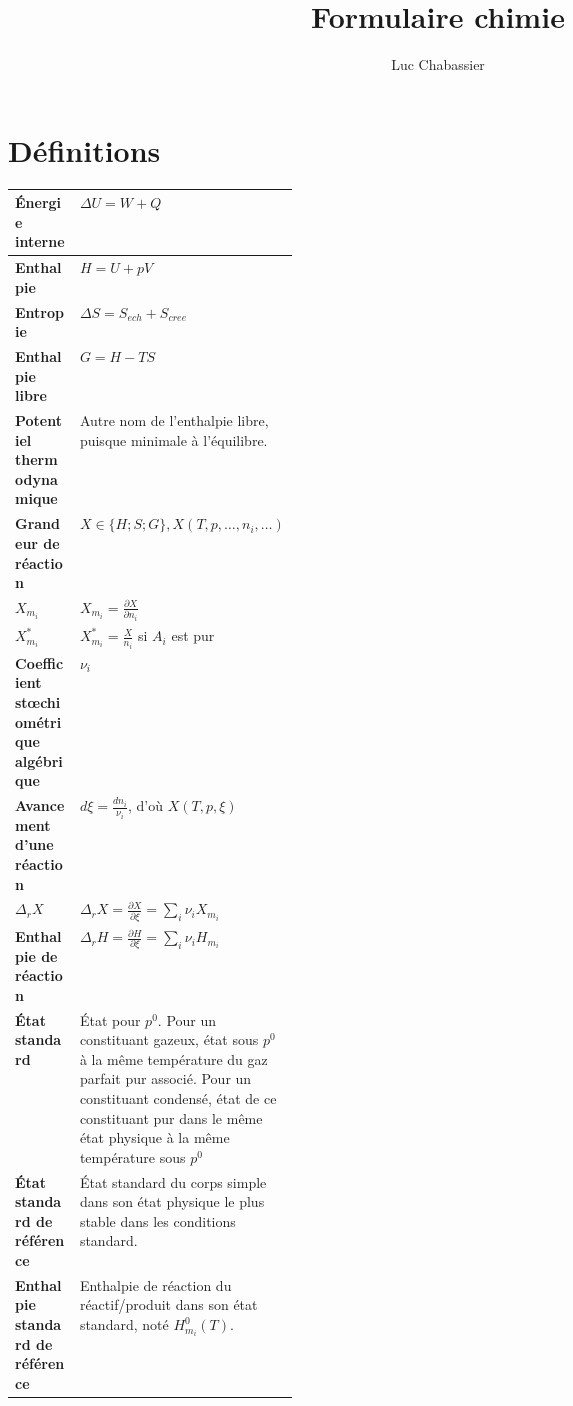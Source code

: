 \documentclass[12pt,a4paper] {article}
\begin{document}
\title{Formulaire chimie}
\author{Luc Chabassier}
\maketitle

\section{Définitions}
\begin{tabularx}{\linewidth}{|>{\bfseries}p{0.33\linewidth}|X|} \hline
    Énergie interne & $\Delta U = W + Q$ \\ \hline
    Enthalpie        & $H = U + pV$ \\ \hline
    Entropie        & $\Delta S = S_{ech} + S_{cree}$ \\ \hline
    Enthalpie libre  & $G = H - TS$ \\ \hline
    Potentiel thermodynamique & Autre nom de l'enthalpie libre, puisque minimale à l'équilibre. \\ \hline
    Grandeur de réaction & $X \in\{H; S; G\}, X(T, p, \ldots, n_i, \ldots)$ \\ \hline
    $X_{m_i}$ & $X_{m_i} = \frac{\partial X}{\partial n_i}$ \\ \hline
    $X_{m_i}^*$ & $X_{m_i}^* = \frac{X}{n_i}$ si $A_i$ est pur \\ \hline
    Coefficient stœchiométrique algébrique & $\nu_i$ \\ \hline
    Avancement d'une réaction & $d\xi = \frac{dn_i}{\nu_i}$, d'où $X(T,p,\xi)$ \\ \hline
    $\Delta_r X$ & $\Delta_r X = \frac{\partial X}{\partial \xi} = \sum_i \nu_i X_{m_i}$ \\ \hline
    Enthalpie de réaction & $\Delta_r H = \frac{\partial H}{\partial \xi} = \sum_i \nu_i H_{m_i}$ \\ \hline
    État standard & État pour $p^0$. Pour un constituant gazeux, état sous $p^0$ à la même température du gaz parfait pur associé. Pour un constituant condensé, état de ce constituant pur dans le même état physique à la même température sous $p^0$ \\ \hline
    État standard de référence & État standard du corps simple dans son état physique le plus stable dans les conditions standard. \\ \hline
    Enthalpie standard de référence & Enthalpie de réaction du réactif/produit dans son état standard, noté $H_{m_i}^0(T)$. \\ \hline

\end{tabularx}
\end{document}
